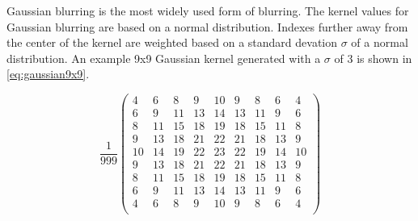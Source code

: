 \documentclass[12pt]{article}
\begin{document}
			Gaussian blurring is the most widely used form of blurring. The kernel values for Gaussian blurring are based on a normal distribution. Indexes further away from the center of the kernel are weighted based on a standard devation $\sigma$ of a normal distribution. An example 9x9 Gaussian kernel generated with a $\sigma$ of 3 is shown in \eqref{eq:gaussian9x9}. 

				\begin{equation}
					\frac{1}{999}
					\begin{pmatrix}
						\label{eq:gaussian9x9}
						4 	& 6 	& 8		& 9 	& 10 	& 9 	& 8 	& 6 	& 4 \\
						6 	& 9 	& 11	& 13	& 14 	& 13 	& 11 	& 9 	& 6 \\
						8 	& 11 	& 15	& 18 	& 19 	& 18 	& 15 	& 11 	& 8 \\
						9 	& 13 	& 18	& 21 	& 22 	& 21 	& 18 	& 13 	& 9 \\
						10 	& 14 	& 19	& 22 	& 23 	& 22 	& 19 	& 14 	& 10 \\
						9 	& 13 	& 18	& 21 	& 22 	& 21 	& 18 	& 13 	& 9 \\
						8 	& 11 	& 15	& 18 	& 19 	& 18 	& 15 	& 11 	& 8 \\
						6 	& 9 	& 11	& 13	& 14 	& 13 	& 11 	& 9 	& 6 \\
						4 	& 6 	& 8		& 9 	& 10 	& 9 	& 8 	& 6 	& 4 \\
					\end{pmatrix}
				\end{equation}
\end{document}
